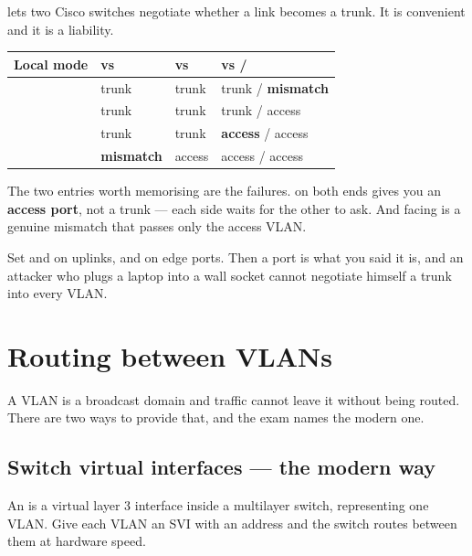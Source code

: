 lets two Cisco switches negotiate whether a link
becomes a trunk. It is convenient and it is a liability.

\begin{longtable}{@{}L{3.6cm}L{3.4cm}L{3.4cm}L{4.2cm}@{}}
\toprule
{}
\textbf{Local mode} & \textbf{vs } & \textbf{vs } & \textbf{vs  / } \\
\midrule
\endhead
{} & trunk & trunk & trunk / \textbf{mismatch} \\
 & trunk & trunk & trunk / access \\
 & trunk & trunk & \textbf{access} / access \\
 & \textbf{mismatch} & access & access / access \\
\bottomrule
\end{longtable}

The two entries worth memorising are the failures.  on both
ends gives you an \textbf{access port}, not a trunk --- each side waits for the
other to ask. And  facing  is a genuine mismatch that
passes only the access VLAN.

\begin{conceptbox}
Set  and  on uplinks, and
 on edge ports. Then a port is what you said it is,
and an attacker who plugs a laptop into a wall socket cannot negotiate himself a
trunk into every VLAN.
\end{conceptbox}

\section{Routing between VLANs}

A VLAN is a broadcast domain and traffic cannot leave it without being routed.
There are two ways to provide that, and the exam names the modern one.

\subsection{Switch virtual interfaces --- the modern way}

An  is a virtual layer 3 interface inside a multilayer switch,
representing one VLAN. Give each VLAN an SVI with an address and the switch
routes between them at hardware speed.

